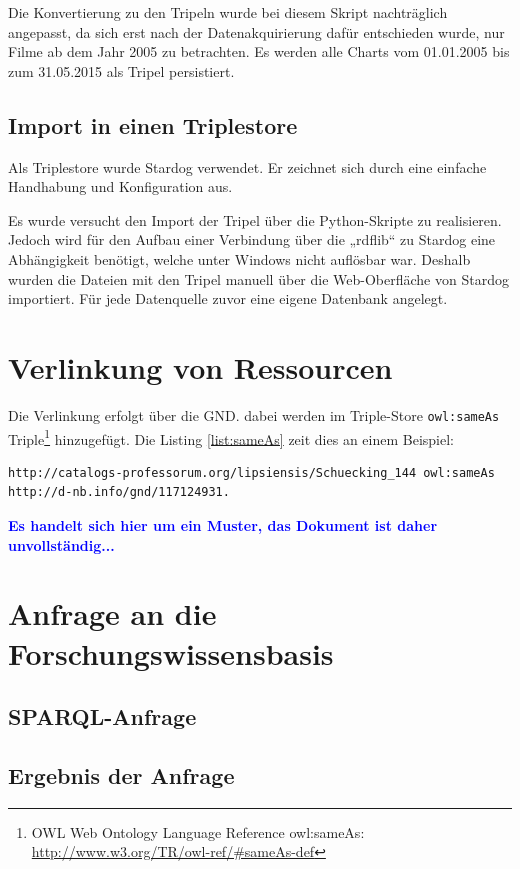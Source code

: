 \documentclass[parskip]{scrartcl}
\begin{document}
Die Konvertierung zu den Tripeln wurde bei diesem Skript nachträglich angepasst, da sich erst nach der Datenakquirierung dafür entschieden wurde, nur Filme ab dem Jahr 2005 zu betrachten. Es werden alle Charts vom 01.01.2005 bis zum 31.05.2015 als Tripel persistiert.


\subsection{Import in einen Triplestore}
Als Triplestore wurde Stardog verwendet. Er zeichnet sich durch eine einfache Handhabung und Konfiguration aus.

Es wurde versucht den Import der Tripel über die Python-Skripte zu realisieren. Jedoch wird für den Aufbau einer Verbindung über die „rdflib“ zu Stardog eine Abhängigkeit benötigt, welche unter Windows nicht auflösbar war. Deshalb wurden die Dateien mit den Tripel manuell über die Web-Oberfläche von Stardog importiert. Für jede Datenquelle zuvor eine eigene Datenbank angelegt.


\section{Verlinkung von Ressourcen}

Die Verlinkung erfolgt über die GND. dabei werden im Triple-Store \verb+owl:sameAs+ Triple\footnote{OWL Web Ontology Language
Reference owl:sameAs: \url{http://www.w3.org/TR/owl-ref/#sameAs-def}} hinzugefügt. Die Listing \ref{list:sameAs} zeit dies an einem Beispiel:

\begin{lstlisting}[caption={Beispiel für die Verwendung von owl:sameAS}, label={list:sameAs}]
http://catalogs-professorum.org/lipsiensis/Schuecking_144 owl:sameAs http://d-nb.info/gnd/117124931.
\end{lstlisting}


\textcolor{blue}{\textbf{Es handelt sich hier um ein Muster, das Dokument ist daher unvollständig...}}

\section{Anfrage an die Forschungswissensbasis}

\subsection{SPARQL-Anfrage}

\subsection{Ergebnis der Anfrage}
\end{document}
